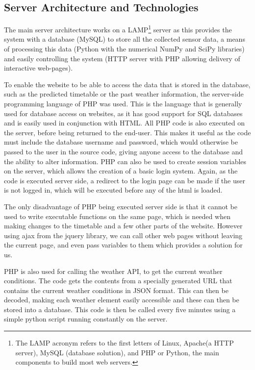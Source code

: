 \documentclass[10.5pt,a4paper,twoside]{report}   %
\begin{document}
\subsection{Server Architecture and Technologies}
The main server architecture works on a LAMP\footnote{The LAMP acronym  refers to the first letters of Linux, Apache(a HTTP server), MySQL (database solution), and PHP or Python, the main components to build most web servers.} server as this provides the system with a database (MySQL) to store all the collected sensor data, a means of processing this data (Python with the numerical NumPy and SciPy libraries) and easily controlling the system (HTTP server with PHP allowing delivery of interactive web-pages). 

To enable the website to be able to access the data that is stored in the database, such as the predicted timetable or the past weather information, the server-side programming language of PHP was used. This is the language that is generally used for database access on websites, as it has good support for SQL databases and is easily used in conjunction with HTML. All PHP code is also executed on the server, before being returned to the end-user. This makes it useful as the code must include the database username and password, which would otherwise be passed to the user in the source code, giving anyone access to the database and the ability to alter information. PHP can also be used to create session variables on the server, which allows the creation of a basic login system. Again, as the code is executed server side, a redirect to the login page can be made if the user is not logged in, which will be executed before any of the html is loaded.

The only disadvantage of PHP being executed server side is that it cannot be used to write executable functions on the same page, which is needed when making changes to the timetable and a few other parts of the website. However using ajax from the jquery library, we can call other web pages without leaving the current page, and even pass variables to them which provides a solution for us.

PHP is also used for calling the weather API, to get the current weather conditions. The code gets the contents from a specially generated URL that contains the current weather conditions in JSON format. This can then be decoded, making each weather element easily accessible and these can then be stored into a database. This code is then be called every five minutes using a simple python script running constantly on the server.
\end{document}

